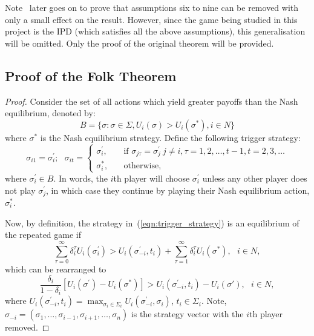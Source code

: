 Note~\cite{Friedman1971} later goes on to prove that assumptions
six to nine can be removed with only a small effect on the result. However,
since the game being studied in this project is the IPD (which satisfies
all the above assumptions), this generalisation will be omitted. Only the
proof of the original theorem will be provided.

\subsection{Proof of the Folk Theorem}

\begin{proof}
    Consider the set of all actions which yield greater payoffs than the Nash
    equilibrium, denoted by:
    \begin{equation}
        B = \{\sigma : \sigma \in \Sigma, U_{i}(\sigma) > U_{i}(\sigma^{*}), i \in N\}
    \end{equation}
    where \(\sigma^{*}\) is the Nash equilibrium strategy. Define the following trigger strategy:
    \begin{equation}\label{eqn:trigger_strategy}
        \sigma_{i1} = \sigma_{i}^{\prime};~~~
        \sigma_{it} = \begin{cases}
            \sigma_{i}^{\prime}, & \quad \text{if } \sigma_{j\tau}=\sigma_{j}^{\prime} \ j \ne i, \tau=1, 2, \ldots, t-1, t=2, 3, \ldots \\
            \sigma_{i}^{*}, & \quad \text{otherwise},
        \end{cases}
    \end{equation}
    where \(\sigma_{i}^{\prime} \in B\). In words, the \(i\)th player will choose \(\sigma_{i}^{\prime}\) unless any
    other player does not play \( \sigma_{j}^{\prime}\), in which case they
    continue by playing their Nash equilibrium action, \(\sigma_{i}^{*}\). 
    
    Now, by definition, the strategy in~(\ref{eqn:trigger_strategy}) is an
    equilibrium of the repeated game if 
    \begin{equation}
        \sum_{\tau=0}^{\infty}{\delta_{i}^{\tau}U_{i}(\sigma_{i}^{\prime})} > U_{i}(\sigma_{-i}^{\prime}, t_{i}) + \sum_{\tau=1}^{\infty}{\delta_{i}^{\tau}U_{i}(\sigma^{*})},~~~ i \in N,
    \end{equation}
    which can be rearranged to 
    \begin{equation}
        \frac{\delta_{i}}{1-\delta_{i}}[U_{i}(\sigma^{\prime}) - U_{i}(\sigma^{*})] > U_{i}(\sigma_{-i}^{\prime}, t_{i}) - U_{i}(\sigma{\prime}),~~~ i \in N,
    \end{equation}
    where \(U_{i}(\sigma_{-i}^{\prime}, t_{i}) = \max_{\sigma_{i} \in
    \Sigma_{i}}{U_{i}(\sigma_{-i}^{\prime}, \sigma_{i})}\), \(t_{i} \in
    \Sigma_{i}\). Note, \(\sigma_{-i} = (\sigma_{1}, \ldots, \sigma_{i-1},
    \sigma_{i+1}, \ldots, \sigma_{n})\) is the strategy vector with the \(i\)th
    player removed.


\end{proof}
